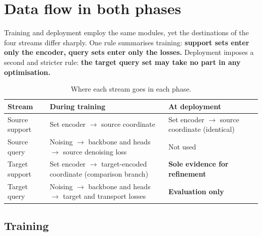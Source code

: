 \documentclass[11pt]{article}
\begin{document}
\section{Data flow in both phases}
\label{sec:flow}

Training and deployment employ the same modules, yet the destinations of the four streams differ
sharply. One rule summarises training: \textbf{support sets enter only the encoder, query sets enter
only the losses.} Deployment imposes a second and stricter rule: \textbf{the target query set may
take no part in any optimisation.}

\begin{table}[htbp]
\centering\small
\begin{tabular}{@{}p{3.0cm}p{5.6cm}p{5.2cm}@{}}
\toprule
\textbf{Stream} & \textbf{During training} & \textbf{At deployment} \\
\midrule
Source support & Set encoder $\to$ source coordinate & Set encoder $\to$ source coordinate (identical) \\
Source query   & Noising $\to$ backbone and heads $\to$ source denoising loss & Not used \\
Target support & Set encoder $\to$ target-encoded coordinate (comparison branch)
               & \textbf{Sole evidence for refinement} \\
Target query   & Noising $\to$ backbone and heads $\to$ target and transport losses
               & \textbf{Evaluation only} \\
\bottomrule
\end{tabular}
\caption{Where each stream goes in each phase.}
\label{tab:flow}
\end{table}

\subsection{Training}
\end{document}
